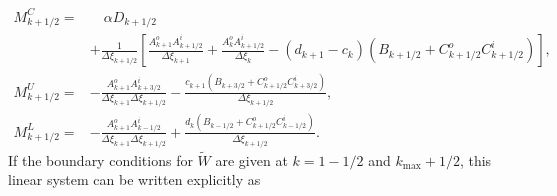 \begin{align}
 M^C_{k+1/2} = & \quad \alpha D_{k+1/2} \nonumber\label{e:M^C}\\
               & + \frac{1}{\Delta\xi_{k+1/2}}
 \left[
   \frac{A^o_{k+1} A^i_{k+1/2}}{\Delta\xi_{k+1}}
 + \frac{A^o_k A^i_{k+1/2}}{\Delta\xi_k}
 - (d_{k+1}-c_k)(B_{k+1/2}+C^o_{k+1/2} C^i_{k+1/2})
 \right],\\
 M^U_{k+1/2} = &
 - \frac{A^o_{k+1} A^i_{k+3/2}}
        {\Delta\xi_{k+1}\Delta\xi_{k+1/2}}
 - \frac{c_{k+1}(B_{k+3/2}+C^o_{k+1/2} C^i_{k+3/2} )}
 {\Delta\xi_{k+1/2}} ,\label{e:M^U}\\
 M^L_{k+1/2} = &
 -\frac{A^o_{k+1}A^i_{k-1/2}}{\Delta\xi_{k+1}\Delta\xi_{k+1/2}}
 +\frac{d_k(B_{k-1/2}+C^o_{k+1/2}C^i_{k-1/2})}{\Delta\xi_{k+1/2}} .\label{e:M^L}
\end{align}
%
If the boundary conditions for $\tilde{W}$ are given at $k=1-1/2$ and
$k_\text{max} + 1/2$, this linear system can be written explicitly as
%

